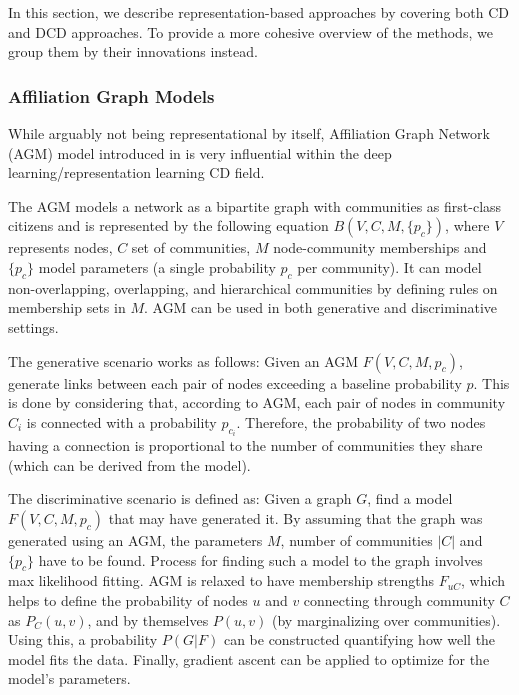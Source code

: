 \documentclass[
acmsmall,
nonacm,
screen,
acmthm]{acmart}
\begin{document}
In this section, we describe representation-based approaches by covering
both CD and DCD approaches. To provide a more cohesive overview of the
methods, we group them by their innovations instead.

\hypertarget{affiliation-graph-models}{%
\subsubsection{Affiliation Graph
Models}\label{affiliation-graph-models}}

While arguably not being representational by itself, Affiliation Graph
Network (AGM) model introduced in
\citet{yangCommunityAffiliationGraphModel2012} is very influential
within the deep learning/representation learning CD field.

The AGM models a network as a bipartite graph with communities as
first-class citizens and is represented by the following equation
\(B(V, C, M, \{p_c\})\), where \(V\) represents nodes, \(C\) set of
communities, \(M\) node-community memberships and \(\{p_c\}\) model
parameters (a single probability \(p_c\) per community). It can model
non-overlapping, overlapping, and hierarchical communities by defining
rules on membership sets in \(M\). AGM can be used in both generative
and discriminative settings.

The generative scenario works as follows: Given an AGM
\(F(V, C, M, {p_c})\), generate links between each pair of nodes
exceeding a baseline probability \(p\). This is done by considering
that, according to AGM, each pair of nodes in community \(C_i\) is
connected with a probability \(p_{c_i}\). Therefore, the probability of
two nodes having a connection is proportional to the number of
communities they share (which can be derived from the model).

The discriminative scenario is defined as: Given a graph \(G\), find a
model \(F(V, C, M, {p_c})\) that may have generated it. By assuming that
the graph was generated using an AGM, the parameters \(M\), number of
communities \(|C|\) and \(\{p_c\}\) have to be found. Process for
finding such a model to the graph involves max likelihood fitting. AGM
is relaxed to have membership strengths \(F_{uC}\), which helps to
define the probability of nodes \(u\) and \(v\) connecting through
community \(C\) as \(P_{C}(u, v)\), and by themselves \(P(u, v)\) (by
marginalizing over communities). Using this, a probability \(P(G|F)\)
can be constructed quantifying how well the model fits the data.
Finally, gradient ascent can be applied to optimize for the model's
parameters.
\end{document}
